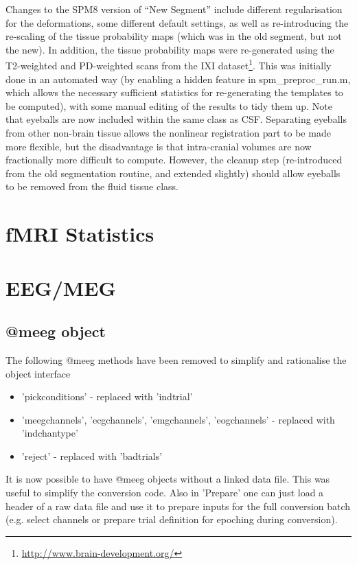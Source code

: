 \documentclass[a4paper,titlepage,openany]{article}
\begin{document}
\begin{multicols}{2}
Changes to the SPM8 version of ``New Segment'' include different regularisation for the deformations, some different default settings, as well as re-introducing the re-scaling of the tissue probability maps (which was in the old segment, but not the new).  In addition, the tissue probability maps were re-generated using the T2-weighted and PD-weighted scans from the IXI dataset\footnote{\url{http://www.brain-development.org/}}.
This was initially done in an automated way (by enabling a hidden feature in spm\_preproc\_run.m, which allows the necessary sufficient statistics for re-generating the templates to be computed), with some manual editing of the results to tidy them up.
Note that eyeballs are now included within the same class as CSF.
Separating eyeballs from other non-brain tissue allows the nonlinear registration part to be made more flexible, but the disadvantage is that intra-cranial volumes are now fractionally more difficult to compute.
However, the cleanup step (re-introduced from the old segmentation routine, and extended slightly) should allow eyeballs to be removed from the fluid tissue class.

\section{fMRI Statistics}

\section{EEG/MEG}

\subsection{@meeg object}

The following @meeg methods have been removed to simplify and rationalise the object interface
\begin{itemize}
\item   'pickconditions' - replaced with 'indtrial'
\item   'meegchannels', 'ecgchannels', 'emgchannels',  'eogchannels' - replaced with 'indchantype'
\item 'reject' - replaced with 'badtrials'
\end{itemize}

It is now possible to have @meeg objects without a linked data file. This was useful to simplify the conversion code. Also in 'Prepare' one can just load a header of a raw data file and use it to prepare inputs for the full conversion batch (e.g. select channels or prepare trial definition for epoching during conversion). 



\end{multicols}
\end{document}
